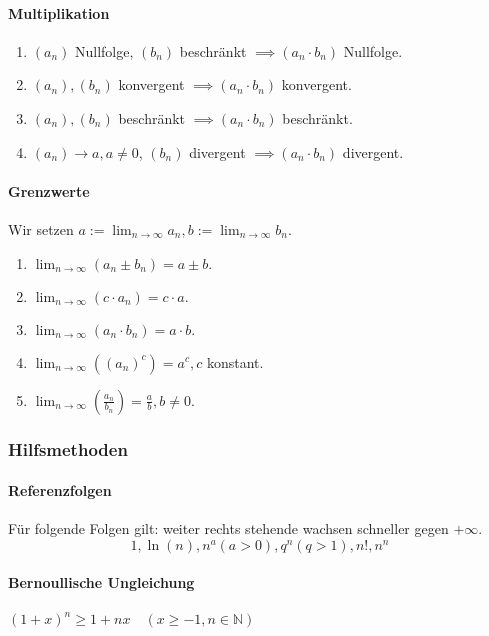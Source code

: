 \documentclass[a4paper, 9pt, DIV=24]{scrartcl}
\newcommand{\N}{\mathbb{N}}
\begin{document}
\paragraph{Multiplikation}
\begin{enumerate}[label={(}\arabic*{)}]
 \item $(a_n)$ Nullfolge, $(b_n)$ beschränkt $\implies (a_n \cdot b_n)$ Nullfolge.
 \item $(a_n), (b_n)$ konvergent $\implies (a_n \cdot b_n)$ konvergent.
 \item $(a_n), (b_n)$ beschränkt $\implies (a_n \cdot b_n)$ beschränkt.
 \item $(a_n) \rightarrow a, a \neq 0$, $(b_n)$ divergent $\implies (a_n \cdot b_n)$ divergent.
\end{enumerate}
\paragraph{Grenzwerte} Wir setzen $a := \lim_{n\rightarrow\infty} a_n, b := \lim_{n\rightarrow\infty} b_n.$
\begin{enumerate}[label={(}\arabic*{)}]
 \item $\lim_{n\rightarrow\infty}(a_n \pm b_n) = a \pm b.$
 \item $\lim_{n\rightarrow\infty}(c\cdot a_n) = c\cdot a.$
 \item $\lim_{n\rightarrow\infty}(a_n \cdot b_n) = a \cdot b.$
 \item $\lim_{n\rightarrow\infty}((a_n)^c) = a^c, c$ konstant.
 \item $\lim_{n\rightarrow\infty}(\frac{a_n}{b_n}) = \frac{a}{b}, b \neq 0.$
\end{enumerate}

\subsubsection{Hilfsmethoden}
\paragraph{Referenzfolgen}
Für folgende Folgen gilt: weiter rechts stehende wachsen schneller gegen $+\infty$.
\[1, \ln(n), n^a (a > 0), q^n (q > 1), n!, n^n\]

\paragraph{Bernoullische Ungleichung}
$(1+x)^n \geq 1 + nx \quad (x \geq -1, n \in \N)$
\end{document}
